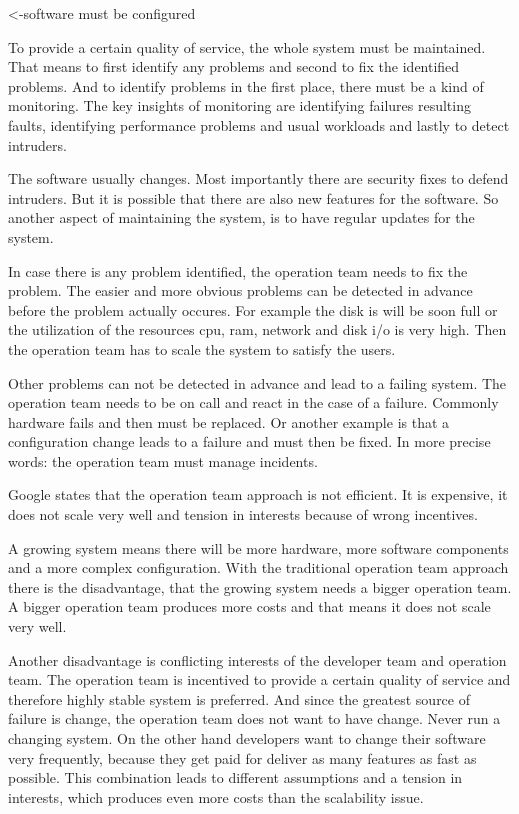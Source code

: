 <-software must be configured

To provide a certain quality of service, the whole system must be maintained. That means to first identify any problems and second to fix the identified problems. And to identify problems in the first place, there must be a kind of monitoring. The key insights of monitoring\cite[p. 127/8]{devops} are identifying failures resulting faults, identifying performance problems and usual workloads and lastly to detect intruders.

The software usually changes. Most importantly there are security fixes to defend intruders. But it is possible that there are also new features for the software. So another aspect of maintaining the system, is to have regular updates for the system.

In case there is any problem identified, the operation team needs to fix the problem. The easier and more obvious problems can be detected in advance before the problem actually occures. For example the disk is will be soon full or the utilization of the resources cpu, ram, network and disk i/o is very high. Then the operation team has to scale the system to satisfy the users.

Other problems can not be detected in advance and lead to a failing system. The operation team needs to be on call and react in the case of a failure. Commonly hardware fails and then must be replaced. Or another example is that a configuration change leads to a failure and must then be fixed. In more precise words: the operation team must manage incidents.

Google states that the operation team approach is not efficient\cite[p. 3/4]{site_reliability}. It is expensive, it does not scale very well and tension in interests because of wrong incentives.

A growing system means there will be more hardware, more software components and a more complex configuration. With the traditional operation team approach there is the disadvantage, that the growing system needs a bigger operation team. A bigger operation team produces more costs and that means it does not scale very well.

Another disadvantage is conflicting interests of the developer team and operation team. The operation team is incentived to provide a certain quality of service and therefore highly stable system is preferred. And since the greatest source of failure is change\cite[p.10]{site_reliability}, the operation team does not want to have change. Never run a changing system. On the other hand developers want to change their software very frequently, because they get paid for deliver as many features as fast as possible. This combination leads to different assumptions and a tension in interests, which produces even more costs than the scalability issue.

